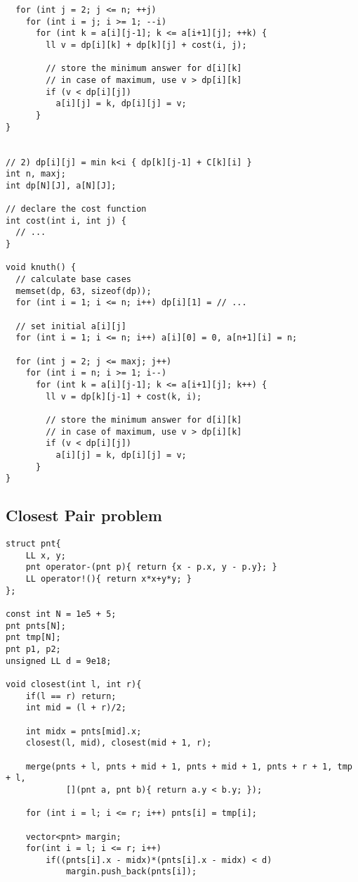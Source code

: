 \documentclass[12pt,a4paper,onesided]{article}
\begin{document}
\begin{multicols}{3}
\begin{lstlisting}
  for (int j = 2; j <= n; ++j)
    for (int i = j; i >= 1; --i)
      for (int k = a[i][j-1]; k <= a[i+1][j]; ++k) {
        ll v = dp[i][k] + dp[k][j] + cost(i, j);

        // store the minimum answer for d[i][k]
        // in case of maximum, use v > dp[i][k]
        if (v < dp[i][j])
          a[i][j] = k, dp[i][j] = v;
      }
}


// 2) dp[i][j] = min k<i { dp[k][j-1] + C[k][i] }
int n, maxj;
int dp[N][J], a[N][J];

// declare the cost function
int cost(int i, int j) {
  // ...
}

void knuth() {
  // calculate base cases
  memset(dp, 63, sizeof(dp));
  for (int i = 1; i <= n; i++) dp[i][1] = // ...

  // set initial a[i][j]
  for (int i = 1; i <= n; i++) a[i][0] = 0, a[n+1][i] = n;

  for (int j = 2; j <= maxj; j++)
    for (int i = n; i >= 1; i--)
      for (int k = a[i][j-1]; k <= a[i+1][j]; k++) {
        ll v = dp[k][j-1] + cost(k, i);

        // store the minimum answer for d[i][k]
        // in case of maximum, use v > dp[i][k]
        if (v < dp[i][j])
          a[i][j] = k, dp[i][j] = v;
      }
}
\end{lstlisting}



\subsection{Closest Pair problem}
\begin{lstlisting}
struct pnt{
    LL x, y;
    pnt operator-(pnt p){ return {x - p.x, y - p.y}; }
    LL operator!(){ return x*x+y*y; }
};

const int N = 1e5 + 5;
pnt pnts[N];
pnt tmp[N];
pnt p1, p2;
unsigned LL d = 9e18;

void closest(int l, int r){
    if(l == r) return;
    int mid = (l + r)/2;
    
    int midx = pnts[mid].x;
    closest(l, mid), closest(mid + 1, r);

    merge(pnts + l, pnts + mid + 1, pnts + mid + 1, pnts + r + 1, tmp + l,
            [](pnt a, pnt b){ return a.y < b.y; });

    for (int i = l; i <= r; i++) pnts[i] = tmp[i];

    vector<pnt> margin;
    for(int i = l; i <= r; i++)
        if((pnts[i].x - midx)*(pnts[i].x - midx) < d)
            margin.push_back(pnts[i]);


\end{lstlisting}
\end{multicols}
\end{document}
